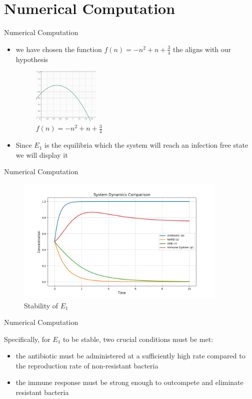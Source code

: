 \documentclass{beamer}
\begin{document}
\section{Numerical Computation}
\begin{frame}[shrink= 25]{Numerical Computation}
\begin{itemize}
	\item we have chosen the function $f(n)=-n^2+n+\frac{3}{4}$ the aligns with our hypothesis
	 \vspace{1mm}  
	\begin{figure}
			\includegraphics[width=0.3\textwidth]{Screenshot 2025-08-04 174654.png}
		\caption{$f(n)=-n^2+n+\frac{3}{4}$}
	\end{figure}
	\item Since $E_1$ is the equilibria which the system will reach an infection free state we will display it
\end{itemize}

\end{frame}

\begin{frame}{Numerical Computation}
\begin{figure}
		\includegraphics[width=0.9\textwidth]{equiliberia1.png}
        \caption{Stability of $E_1$}
\end{figure}	

\end{frame}

\begin{frame}{Numerical Computation}
	
	Specifically, for $E_1$ to be stable, two crucial conditions must be met:
	\begin{itemize}
		\item the antibiotic must be administered at a sufficiently	high rate compared to the reproduction rate of non-resistant bacteria
		\item the immune response must be strong enough to outcompete and eliminate resistant bacteria
	\end{itemize}
	
\end{frame}
\end{document}
